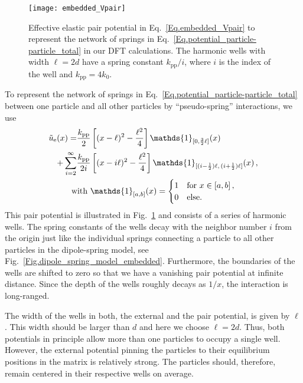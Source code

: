 \documentclass[aps,pre,twocolumn,superscriptaddress,nofootinbib]{revtex4}
\begin{document}
%
%
\begin{figure}
	\texttt{[image: embedded\_Vpair]}
	\caption{Effective elastic pair potential in Eq.~\eqref{Eq.embedded_Vpair} to represent the network of springs in Eq.~\eqref{Eq.potential_particle-particle_total} in our DFT calculations. The harmonic wells with width $\ell = 2d$ have a spring constant  $k_\textrm{pp}/i$, where $i$ is the index of the well and $k_\textrm{pp}= 4 k_0$.}
	\label{Fig.embedded_Vpair}
\end{figure}
%
To represent the network of springs in Eq.~\eqref{Eq.potential_particle-particle_total} between one particle and all other particles by ``pseudo-spring'' interactions, we use 
%
\begin{equation}
	\begin{gathered}
		\begin{aligned}
			\tilde{u}_\textrm{e}(x) = &\frac{k_\textrm{pp}}{2} \left[ (x - \ell)^2 - \frac{{\ell}^2}{4} \right] \mathds{1}_{[0, \frac{3}{2} \ell]}(x) \\
				+ \sum_{i=2}^\infty &\frac{k_\textrm{pp}}{2i} \left[ (x - i\ell)^2 - \frac{{\ell}^2}{4} \right] \mathds{1}_{[(i - \frac{1}{2})\ell, \, (i + \frac{1}{2})\ell]}(x) \, ,
		\end{aligned}
		\\
		\textrm{with } \mathds{1}_{[a,b]}(x) = \begin{cases}
			1	& \textnormal{for} \,\,	x \in [a,b] \, ,	\\
			0	& \textnormal{else} . 
		\end{cases}
	\end{gathered}
	\label{Eq.embedded_Vpair}
\end{equation}
%
This pair potential is illustrated in Fig.~\ref{Fig.embedded_Vpair} and consists of a series of harmonic wells.  
The spring constants of the wells decay with the neighbor number $i$ from the origin just like the individual springs connecting a particle to all other particles in the dipole-spring model, see Fig.~\ref{Fig.dipole_spring_model_embedded}.
Furthermore, the boundaries of the wells are shifted to zero so that we have a vanishing pair potential at infinite distance. 
Since the depth of the wells roughly decays as $1/x$, the interaction is long-ranged.

The width of the wells in both, the external and the pair potential, is given by $\ell$. 
This width should be larger than $d$ and here we choose $\ell = 2d$. 
Thus, both potentials in principle allow more than one particles to occupy a single well. 
However, the external potential pinning the particles to their equilibrium positions in the matrix is relatively strong. 
The particles should, therefore, remain centered in their respective wells on average. 
\end{document}
